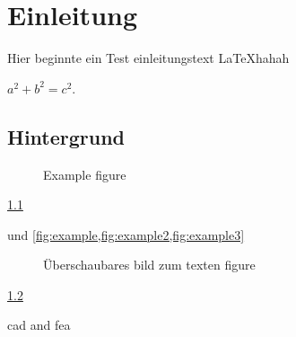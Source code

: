
\chapter{Einleitung}
Hier beginnte ein Test einleitungstext \LaTeX  hahah

$a^2+b^2=c^2$.

\section{Hintergrund}
\begin{figure}[ht]
  \centering
  \caption{Example figure}
  \label{fig:example} %
\end{figure}

\cref{fig:example}

\cite{xeinstein} und \cref{fig:example,fig:example2,fig:example3}

\begin{figure}[ht]
  \centering
  \caption{Überschaubares bild zum texten figure}
  \label{fig:example2} %
\end{figure}

\cref{fig:example2}

\ac{cad}
and \ac{fea}